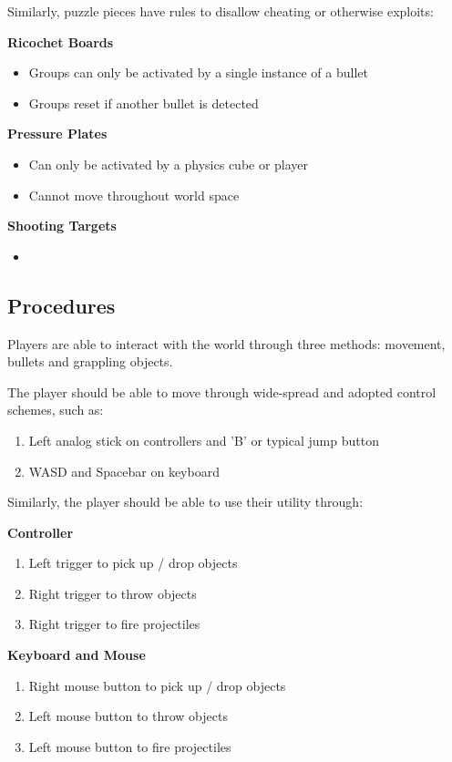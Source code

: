 \documentclass[11pt]{article}
\begin{document}
Similarly, puzzle pieces have rules to disallow cheating or otherwise exploits:

\textbf{Ricochet Boards}
\begin{itemize}
	\item Groups can only be activated by a single instance of a bullet
	\item Groups reset if another bullet is detected \\
\end{itemize}

\textbf{Pressure Plates}
\begin{itemize}
	\item Can only be activated by a physics cube or player
	\item Cannot move throughout world space \\
\end{itemize}

\textbf{Shooting Targets}
\begin{itemize}
	\item 
\end{itemize}


\subsection{Procedures}
Players are able to interact with the world through three methods: movement, bullets and grappling objects. 

The player should be able to move through wide-spread and adopted control schemes, such as:
\begin{enumerate}
	\item Left analog stick on controllers and 'B' or typical jump button
	\item WASD and Spacebar on keyboard
\end{enumerate}

Similarly, the player should be able to use their utility through:

\textbf{Controller}
\begin{enumerate}
	\item Left trigger to pick up / drop objects
	\item Right trigger to throw objects 
	\item Right trigger to fire projectiles 
\end{enumerate}

\textbf{Keyboard and Mouse}
\begin{enumerate}
	\item Right mouse button to pick up / drop objects
	\item Left mouse button to throw objects 
	\item Left mouse button to fire projectiles 
\end{enumerate}
\end{document}
